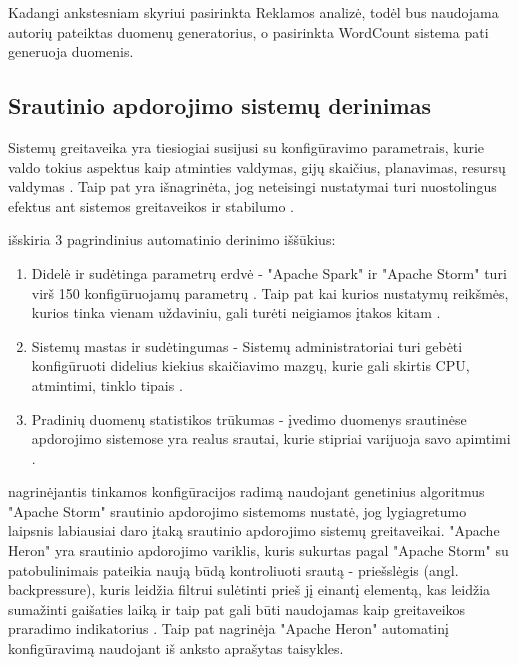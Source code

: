 \documentclass{VUMIFPSbakalaurinis}
\begin{document}
Kadangi ankstesniam skyriui pasirinkta Reklamos analizė, todėl bus naudojama autorių pateiktas duomenų generatorius, o pasirinkta WordCount sistema pati generuoja duomenis.

\subsection{Srautinio apdorojimo sistemų derinimas}
Sistemų greitaveika yra tiesiogiai susijusi su konfigūravimo parametrais, kurie valdo tokius aspektus kaip atminties valdymas, gijų skaičius, planavimas, resursų valdymas \cite{lu2019speedup}. Taip pat yra išnagrinėta, jog neteisingi nustatymai turi nuostolingus efektus ant sistemos greitaveikos ir stabilumo \cite{herodotou2011starfish}. 

\cite{herodotou2020survey} išskiria 3 pagrindinius automatinio derinimo iššūkius:
\begin{enumerate}
    \item Didelė ir sudėtinga parametrų erdvė - "Apache Spark" ir "Apache Storm" turi virš 150 konfigūruojamų parametrų \cite{Bilal2017Towards, petridis2016spark}. Taip pat kai kurios nustatymų reikšmės, kurios tinka vienam uždaviniu, gali turėti neigiamos įtakos kitam \cite{herodotou2011starfish, Pooyan2016Uncertainty}.
    \item Sistemų mastas ir sudėtingumas - Sistemų administratoriai turi gebėti konfigūruoti didelius kiekius skaičiavimo mazgų, kurie gali skirtis CPU, atmintimi, tinklo tipais \cite{herodotou2020survey}.
    \item Pradinių duomenų statistikos trūkumas - įvedimo duomenys srautinėse apdorojimo sistemose yra realus srautai, kurie stipriai varijuoja savo apimtimi \cite{Dayarathna2018Recent}.
\end{enumerate}  

\cite{Trotter2017Into} nagrinėjantis tinkamos konfigūracijos radimą naudojant genetinius algoritmus "Apache Storm" srautinio apdorojimo sistemoms nustatė, jog lygiagretumo laipsnis labiausiai daro įtaką srautinio apdorojimo sistemų greitaveikai. 
"Apache Heron" yra srautinio apdorojimo variklis, kuris sukurtas pagal "Apache Storm" su patobulinimais \cite{twitterHeron} pateikia naują būdą kontroliuoti srautą - priešslėgis (angl. backpressure), kuris leidžia filtrui sulėtinti prieš jį einantį elementą, kas leidžia sumažinti gaišaties laiką ir taip pat gali būti naudojamas kaip greitaveikos praradimo indikatorius \cite{bansal2018trevor}.
Taip pat \cite{bansal2018trevor} nagrinėja "Apache Heron" automatinį konfigūravimą naudojant iš anksto aprašytas taisykles. 
\end{document}
